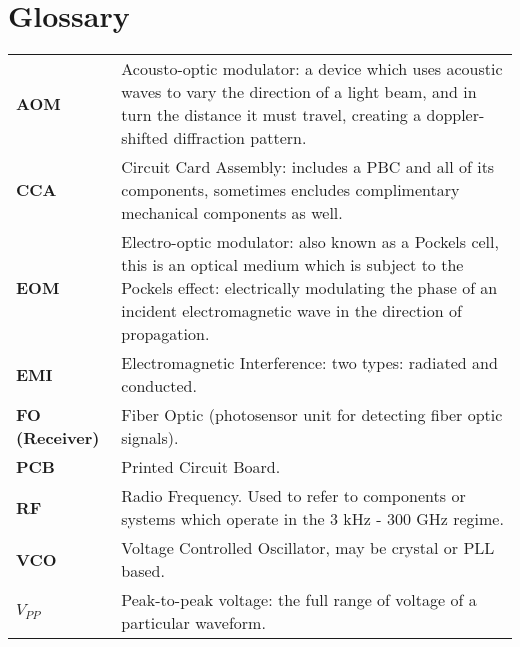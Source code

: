\newpage
\section*{Glossary}

\begin{tabularx}{\linewidth}{lX}
  {\bf AOM} & Acousto-optic modulator: a device which uses acoustic waves to vary the direction of a light beam, and in turn the distance it must travel, creating a doppler-shifted diffraction pattern. \\
  {\bf CCA} & Circuit Card Assembly: includes a PBC and all of its components,
  sometimes encludes complimentary mechanical components as well. \\
  {\bf EOM} & Electro-optic modulator: also known as a Pockels cell, this
  is an optical medium which is subject to the Pockels effect: electrically
  modulating the phase of an incident electromagnetic wave in the direction
  of propagation.\\
  {\bf EMI} & Electromagnetic Interference: two types: radiated and conducted.\\
  {\bf FO (Receiver)} & Fiber Optic (photosensor unit for detecting fiber optic
  signals).  \\
  {\bf PCB} & Printed Circuit Board. \\
  {\bf RF} & Radio Frequency. Used to refer to components or systems which
  operate in the 3 kHz - 300 GHz regime. \\
  {\bf VCO} & Voltage Controlled Oscillator, may be crystal or PLL based. \\
  {\bf $V_{PP}$} & Peak-to-peak voltage: the full range of voltage of a
  particular waveform.
\end{tabularx}
